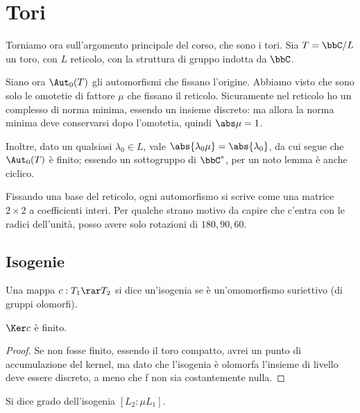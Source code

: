 	
	\section{Tori}
	
	Torniamo ora sull'argomento principale del corso, che sono i tori. Sia $T = \bbC / L$ un toro, con $L$ reticolo, con la struttura di gruppo indotta da $\bbC$.
	
	Siano ora $\Aut_0(T)$ gli automorfismi che fissano l'origine. Abbiamo visto che sono solo le omotetie di fattore $\mu$ che fissano il reticolo. Sicuramente nel reticolo ho un complesso di norma minima, essendo un insieme discreto: ma allora la norma minima deve conservarsi dopo l'omotetia, quindi $\abs \mu=1$.
	
	Inoltre, dato un qualsiasi $\lambda_0 \in L$, vale $\abs{\lambda_0 \mu} = \abs {\lambda_0}$, da cui segue che $\Aut_0(T)$ è finito; essendo un sottogruppo di $\bbC^*$, per un noto lemma è anche ciclico.
	
	Fissando una base del reticolo, ogni automorfismo si scrive come una matrice $2 \times 2$ a coefficienti interi. Per qualche strano motivo da capire che c'entra con le radici dell'unità, %
	posso avere solo rotazioni di $180, 90, 60$.
	
	\subsection{Isogenie}
	
	\begin{definizione}
		Una mappa $c: T_1 \rar T_2$ si dice un'isogenia se è un'omomorfismo suriettivo (di gruppi olomorfi).

	\end{definizione}
	
	\begin{proposizione}
		$\Ker c$ è finito.
	\end{proposizione}
	\begin{proof}
		Se non fosse finito, essendo il toro compatto, avrei un punto di accumulazione del kernel, ma dato che l'isogenia è olomorfa l'insieme di livello deve essere discreto, a meno che f non sia costantemente nulla.
	\end{proof}
	
	\begin{definizione}
		Si dice grado dell'isogenia $[L_2 : \mu L_1]$.
	\end{definizione}
	
